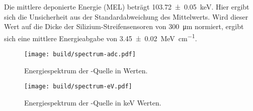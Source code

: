 Die mittlere deponierte Energie (MEL) beträgt \SI{103.72(5)}{\kilo\electronvolt}.
Hier ergibt sich die Unsicherheit aus der Standardabweichung des Mittelwerts.
Wird dieser Wert auf die Dicke der Silizium-Streifensensoren von \SI{300}{\micro\meter}
normiert, ergibt sich eine mittlere Energieabgabe von
\SI{3.45(2)}{\mega\electronvolt\per\centi\meter}.
\begin{figure}
  \centering
  \texttt{[image: build/spectrum-adc.pdf]}  %
  \caption{Energiespektrum der -Quelle in \si{\adc} Werten.}
  \label{fig:spectrum-adc}
\end{figure}
\begin{figure}
  \centering
  \texttt{[image: build/spectrum-eV.pdf]}  %
  \caption{Energiespektrum der -Quelle in \si{\kilo\electronvolt} Werten.}
  \label{fig:spectrum-eV}
\end{figure}
